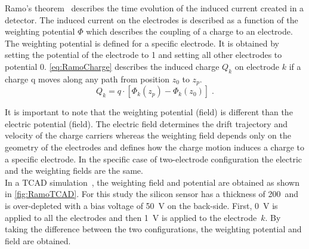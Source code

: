Ramo's theorem~\cite{Ramo:1939vr} describes the time evolution of the induced current
created in a detector. The induced current on the electrodes is
described as a function of the weighting potential $\Phi$ which
describes the coupling of a charge to an electrode. \\
The weighting potential is defined for a specific electrode. It is
obtained by setting the potential of the electrode to 1 and setting
all other electrodes to potential 0. \cref{eq:RamoCharge}
describes the induced charge $Q_k$ on electrode $k$ if a charge q moves along
any path from position $z_0$ to $z_p$.
\begin{equation}
    Q_{k}=q \cdot [\Phi_k(z_p)-\Phi_k(z_0)] \; .
   \label{eq:RamoCharge} 
  \end{equation}

 It is important to note that the weighting potential (field) is
 different than the electric potential (field). The electric field
 determines the drift trajectory and velocity of the charge carriers
 whereas the weighting field depends only on the geometry of the
 electrodes and defines how the charge motion induces a charge to a
 specific electrode. In the specific case of two-electrode configuration the
 electric and the weighting fields are the same. \\
In a TCAD simulation~\cite{synopsysTCAD}, the weighting field and potential are obtained
as shown in \cref{fig:RamoTCAD}. For this study the silicon
sensor has a thickness of 200~\micron and is over-depleted with a bias
voltage of \SI{50}{\volt} on the back-side. First, \SI{0}{\volt} is
applied to all the electrodes and then \SI{1}{\volt} is applied to the
electrode~$k$. By taking the difference between the two
configurations, the weighting potential and field are obtained.



